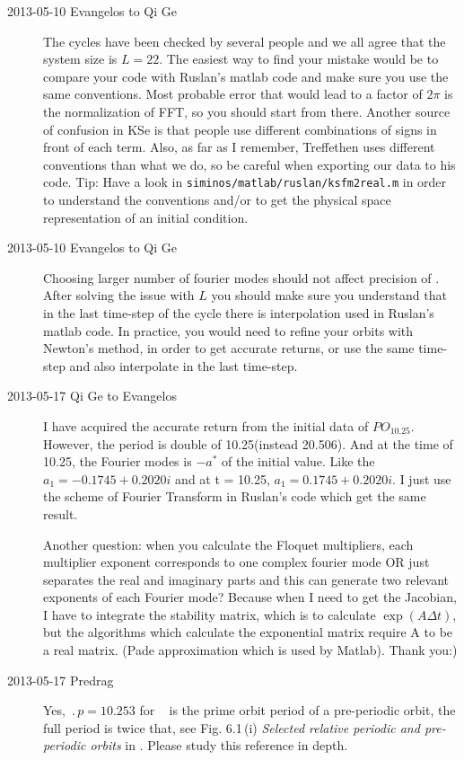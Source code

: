 \begin{description}
\item[2013-05-10 Evangelos to Qi Ge] The cycles have been checked by several people and we all agree that the system size is $L=22$.
The easiest way to find your mistake would be to compare your code with Ruslan's matlab code and make sure you use the same conventions.
Most probable error that would lead to a factor of $2\pi$ is the normalization of FFT, so you should start from there.
Another source of confusion in KSe is that people use different combinations of signs in front of each term.
Also, as far as I remember, Treffethen uses different conventions than what we do, so be careful when exporting our data to his code.
Tip: Have a look in \texttt{siminos/matlab/ruslan/ksfm2real.m} in order to understand the conventions and/or to get the physical
space representation of an initial condition.

\item[2013-05-10 Evangelos to Qi Ge] Choosing larger number of fourier modes should not affect precision of \rpo.
After solving the issue with $L$ you should make sure you understand that in the last time-step of the cycle
there is interpolation used in Ruslan's matlab code.
In practice, you would need to refine your orbits with Newton's method,
in order to get accurate returns, or use the same time-step and also
interpolate in the last time-step.

\item[2013-05-17 Qi Ge to Evangelos]I have acquired the accurate return
from the initial data of \(PO_{10.25}\). However, the period is double of
10.25(instead 20.506). And at the time of 10.25, the Fourier modes is
\(-a^{*}\) of the initial value. Like the \(a_{1} = -0.1745+0.2020i\) and
at t = 10.25, \(a_{1} = 0.1745+0.2020i\). I just use the scheme of
Fourier Transform in Ruslan's code which get the same result.

    Another question: when you calculate the Floquet multipliers,
each multiplier exponent corresponds to one complex fourier mode OR just
separates the real and imaginary parts and this can generate two relevant
exponents of each Fourier mode? Because when I need to get the Jacobian,
I have to integrate the stability matrix, which is to calculate
\(\exp(A\Delta{t})\), but the algorithms which calculate the exponential
matrix require A to be a real matrix. (Pade approximation which is used
by Matlab). Thank you:)

\item[2013-05-17 Predrag] Yes, $\period{p} = 10.253$ for \po\ 
is the prime orbit period of a pre-periodic orbit, the full period is
twice that, see Fig. 6.1\,(i) \emph{Selected relative periodic and
pre-periodic orbits} in . Please study this reference in
depth.


\end{description}
